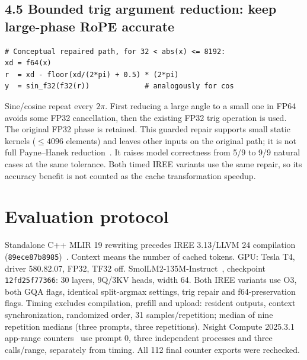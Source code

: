 \documentclass[10pt,a4paper]{article}
\newcommand{\code}[1]{\texttt{#1}}
\newcommand{\smallnote}[1]{{\footnotesize #1\par}}
\begin{document}
\subsection*{4.5 Bounded trig argument reduction: keep large-phase RoPE accurate}
\begin{lstlisting}
# Conceptual repaired path, for 32 < abs(x) <= 8192:
xd = f64(x)
r  = xd - floor(xd/(2*pi) + 0.5) * (2*pi)
y  = sin_f32(f32(r))             # analogously for cos
\end{lstlisting}
Sine/cosine repeat every $2\pi$. First reducing a large angle to a small one in FP64 avoids some FP32 cancellation, then the existing FP32 trig operation is used. The original FP32 phase is retained. This guarded repair supports small static kernels ($\leq4096$ elements) and leaves other inputs on the original path; it is not full Payne--Hanek reduction~\cite{payne}. It raises model correctness from 5/9 to 9/9 natural cases at the same tolerance. Both timed IREE variants use the same repair, so its accuracy benefit is not counted as the cache transformation speedup.
\newpage
\section{Evaluation protocol}
\smallnote{Standalone C++ MLIR 19 rewriting precedes IREE 3.13/LLVM 24 compilation (\code{89ece87b8985})~\cite{mlir}. Context means the number of cached tokens. GPU: Tesla T4, driver 580.82.07, FP32, TF32 off. SmolLM2-135M-Instruct~\cite{model}, checkpoint \code{12fd25f77366}: 30 layers, 9Q/3KV heads, width 64. Both IREE variants use O3, both GQA flags, identical split-argmax settings, trig repair and f64-preservation flags. Timing excludes compilation, prefill and upload: resident outputs, context synchronization, randomized order, 31 samples/repetition; median of nine repetition medians (three prompts, three repetitions). Nsight Compute 2025.3.1 app-range counters~\cite{ncu} use prompt 0, three independent processes and three calls/range, separately from timing. All 112 final counter exports were rechecked.}
\end{document}
